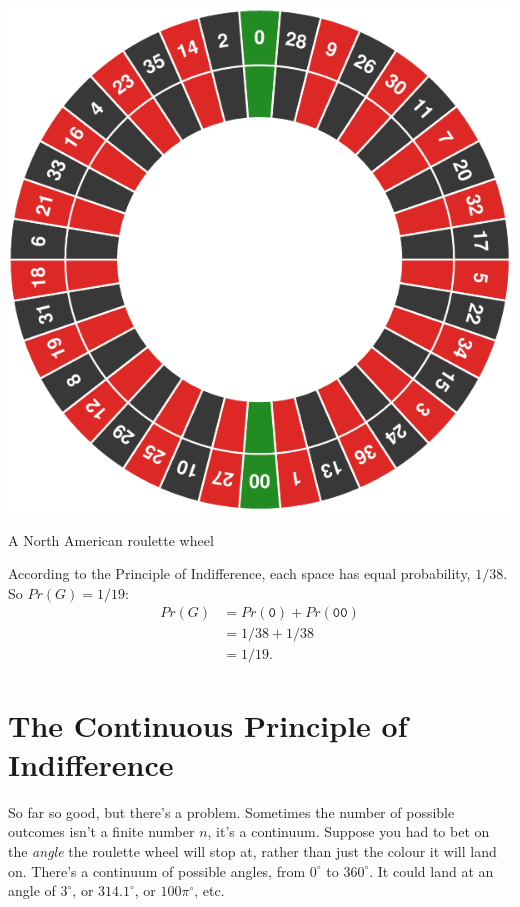 \documentclass[justified]{tufte-book}
\newcommand{\pr}{Pr}
\newcommand{\degr}{^{\circ}}
\theoremstyle{definition}
\theoremstyle{definition}
\theoremstyle{definition}
\theoremstyle{definition}
\theoremstyle{remark}
\begin{document}
\begin{marginfigure}
\includegraphics{_main_files/figure-latex/unnamed-chunk-134-1} \caption[A North American roulette wheel]{A North American roulette wheel}\label{fig:unnamed-chunk-134}
\end{marginfigure}

According to the Principle of Indifference, each space has equal probability, \(1/38\). So \(\pr(G) = 1/19\):
\[
  \begin{aligned}
    \pr(G) &= \pr(\mathtt{0}) + \pr(\mathtt{00})\\
           &= 1/38 + 1/38\\
           &= 1/19.
  \end{aligned}
\]

\hypertarget{the-continuous-principle-of-indifference}{%
\section{The Continuous Principle of Indifference}\label{the-continuous-principle-of-indifference}}

So far so good, but there's a problem. Sometimes the number of possible outcomes isn't a finite number \(n\), it's a continuum. Suppose you had to bet on the \emph{angle} the roulette wheel will stop at, rather than just the colour it will land on. There's a continuum of possible angles, from \(0\degr\) to \(360\degr\). It could land at an angle of \(3\degr\), or \(314.1\degr\), or \(100\pi\degr\), etc.
\end{document}

